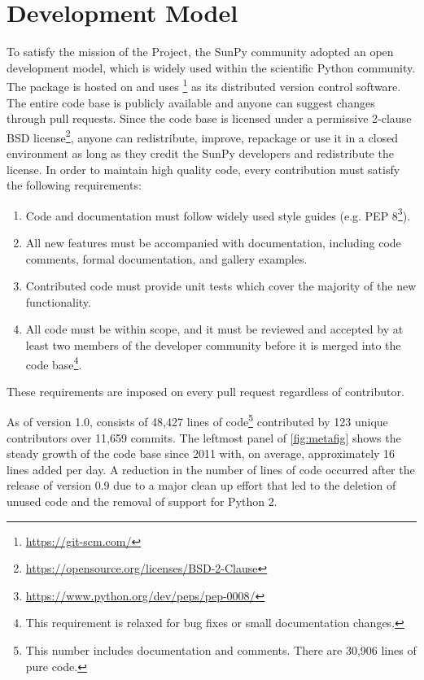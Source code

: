 \section{Development Model}
\label{sec:development}

To satisfy the mission of the Project, the SunPy community adopted an open development model, which is widely used within the scientific Python community.
The \sunpypkg package is hosted on \github and uses \footnote{\url{https://git-scm.com/}} as its distributed version control software.
The entire code base is publicly available and anyone can suggest changes through pull requests.
Since the code base is licensed under a permissive 2-clause BSD license\footnote{\url{https://opensource.org/licenses/BSD-2-Clause}}, anyone can redistribute, improve, repackage or use it in a closed environment as long as they credit the SunPy developers and redistribute the license.
In order to maintain high quality code, every contribution must satisfy the following requirements:
\begin{enumerate}
    \item Code and documentation must follow widely used style guides (e.g. PEP 8\footnote{\url{https://www.python.org/dev/peps/pep-0008/}}).
    \item All new features must be accompanied with documentation, including code comments, formal documentation, and gallery examples.
    \item Contributed code must provide unit tests which cover the majority of the new functionality.
    \item All code must be within scope, and it must be reviewed and accepted by at least two members of the developer community before it is merged into the code base\footnote{This requirement is relaxed for bug fixes or small documentation changes.}.
\end{enumerate}
These requirements are imposed on every pull request regardless of contributor.

As of version 1.0, \sunpypkg consists of 48,427 lines of code\footnote{This number includes documentation and comments.
There are 30,906 lines of pure code.} contributed by 123 unique contributors over 11,659 \git commits.
The leftmost panel of \autoref{fig:metafig} shows the steady growth of the code base since 2011 with, on average, approximately 16 lines added per day.
A reduction in the number of lines of code occurred after the release of version 0.9 due to a major clean up effort that led to the deletion of unused code and the removal of support for Python 2.

